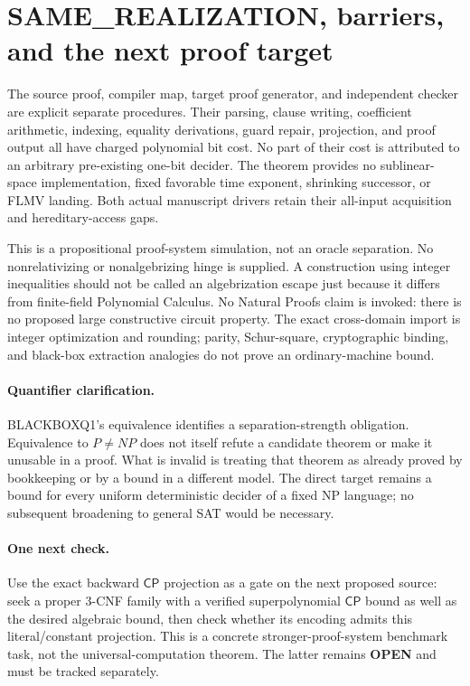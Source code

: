 \documentclass[11pt]{article}
\newcommand{\CP}{\mathsf{CP}}
\begin{document}
\section{SAME\_REALIZATION, barriers, and the next proof target}
The source proof, compiler map, target proof generator, and independent
checker are explicit separate procedures. Their parsing, clause writing,
coefficient arithmetic, indexing, equality derivations, guard repair,
projection, and proof output all have charged polynomial bit cost. No part
of their cost is attributed to an arbitrary pre-existing one-bit decider.
The theorem provides no sublinear-space implementation, fixed favorable time
exponent, shrinking successor, or FLMV landing. Both actual manuscript
drivers retain their all-input acquisition and hereditary-access gaps.

This is a propositional proof-system simulation, not an oracle separation.
No nonrelativizing or nonalgebrizing hinge is supplied. A construction using
integer inequalities should not be called an algebrization escape just
because it differs from finite-field Polynomial Calculus. No Natural Proofs
claim is invoked: there is no proposed large constructive circuit property.
The exact cross-domain import is integer optimization and rounding; parity,
Schur-square, cryptographic binding, and black-box extraction analogies do
not prove an ordinary-machine bound.

\paragraph{Quantifier clarification.}
BLACKBOXQ1's equivalence identifies a separation-strength obligation.
Equivalence to $P\ne NP$ does not itself refute a candidate theorem or make
it unusable in a proof. What is invalid is treating that theorem as already
proved by bookkeeping or by a bound in a different model. The direct target
remains a bound for every uniform deterministic decider of a fixed NP
language; no subsequent broadening to general SAT would be necessary.

\paragraph{One next check.}
Use the exact backward $\CP$ projection as a gate on the next proposed source:
seek a proper 3-CNF family with a verified superpolynomial $\CP$ bound as well
as the desired algebraic bound, then check whether its encoding admits this
literal/constant projection. This is a concrete stronger-proof-system
benchmark task, not the universal-computation theorem. The latter remains
\textbf{OPEN} and must be tracked separately.
\end{document}
